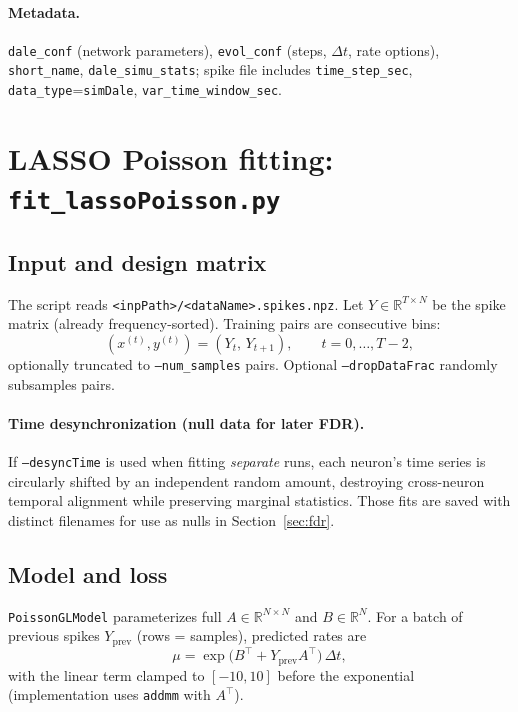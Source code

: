 \documentclass[11pt]{article}
\begin{document}
\paragraph{Metadata.}
\texttt{dale\_conf} (network parameters), \texttt{evol\_conf} (steps, $\Delta t$, rate options), \texttt{short\_name}, \texttt{dale\_simu\_stats}; spike file includes \texttt{time\_step\_sec}, \texttt{data\_type}=\texttt{simDale}, \texttt{var\_time\_window\_sec}.

\section{LASSO Poisson fitting: \texttt{fit\_lassoPoisson.py}}
\label{sec:lasso}

\subsection{Input and design matrix}

The script reads \texttt{<inpPath>/<dataName>.spikes.npz}. Let $Y\in\mathbb{R}^{T\times N}$ be the spike matrix (already frequency-sorted). Training pairs are consecutive bins:
\begin{equation}
  (x^{(t)}, y^{(t)}) = (Y_t,\, Y_{t+1}),\qquad t=0,\ldots,T-2,
\end{equation}
optionally truncated to \texttt{--num\_samples} pairs. Optional \texttt{--dropDataFrac} randomly subsamples pairs.

\paragraph{Time desynchronization (null data for later FDR).}
If \texttt{--desyncTime} is used when fitting \emph{separate} runs, each neuron's time series is circularly shifted by an independent random amount, destroying cross-neuron temporal alignment while preserving marginal statistics. Those fits are saved with distinct filenames for use as nulls in Section~\ref{sec:fdr}.

\subsection{Model and loss}

\texttt{PoissonGLModel} parameterizes full $A\in\mathbb{R}^{N\times N}$ and $B\in\mathbb{R}^N$. For a batch of previous spikes $Y_{\mathrm{prev}}$ (rows = samples), predicted rates are
\begin{equation}
  \mu = \exp\bigl( B^\top + Y_{\mathrm{prev}} A^\top \bigr)\,\Delta t,
\end{equation}
with the linear term clamped to $[-10,10]$ before the exponential (implementation uses \texttt{addmm} with $A^\top$).
\end{document}
